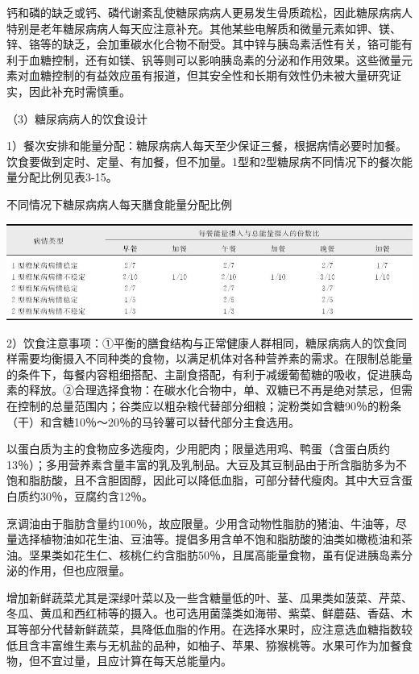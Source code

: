 钙和磷的缺乏或钙、磷代谢紊乱使糖尿病病人更易发生骨质疏松，因此糖尿病病人特别是老年糖尿病病人每天应注意补充。其他某些电解质和微量元素如钾、镁、锌、铬等的缺乏，会加重碳水化合物不耐受。其中锌与胰岛素活性有关，铬可能有利于血糖控制，还有如镁、钒等则可以影响胰岛素的分泌和作用效果。这些微量元素对血糖控制的有益效应虽有报道，但其安全性和长期有效性仍未被大量研究证实，因此补充时需慎重。

（3）糖尿病病人的饮食设计

1）餐次安排和能量分配：糖尿病病人每天至少保证三餐，根据病情必要时加餐。饮食要做到定时、定量、有加餐，但不加量。1型和2型糖尿病不同情况下的餐次能量分配比例见表3-15。

\begin{table}[htbp]
\centering
\caption{不同情况下糖尿病病人每天膳食能量分配比例}
\label{tab3-15}
\includegraphics{./images/Image00031.jpg}
\end{table}

2）饮食注意事项：①平衡的膳食结构与正常健康人群相同，糖尿病病人的饮食同样需要均衡摄入不同种类的食物，以满足机体对各种营养素的需求。在限制总能量的条件下，每餐内容粗细搭配、主副食搭配，有利于减缓葡萄糖的吸收，促进胰岛素的释放。②合理选择食物：在碳水化合物中，单、双糖已不再是绝对禁忌，但需在控制的总量范围内；谷类应以粗杂粮代替部分细粮；淀粉类如含糖90％的粉条（干）和含糖10％～20％的马铃薯可以替代部分主食选用。

以蛋白质为主的食物应多选瘦肉，少用肥肉；限量选用鸡、鸭蛋（含蛋白质约13％）；多用营养素含量丰富的乳及乳制品。大豆及其豆制品由于所含脂肪多为不饱和脂肪酸，且不含胆固醇，因此可以降低血脂，可部分替代瘦肉。其中大豆含蛋白质约30％，豆腐约含12％。

烹调油由于脂肪含量约100％，故应限量。少用含动物性脂肪的猪油、牛油等，尽量选择植物油如花生油、豆油等。提倡多用含单不饱和脂肪酸的油类如橄榄油和茶油。坚果类如花生仁、核桃仁约含脂肪50％，且属高能量食物，虽有促进胰岛素分泌的作用，但也应限量。

增加新鲜蔬菜尤其是深绿叶菜以及一些含糖量低的叶、茎、瓜果类如菠菜、芹菜、冬瓜、黄瓜和西红柿等的摄入。也可选用菌藻类如海带、紫菜、鲜蘑菇、香菇、木耳等部分代替新鲜蔬菜，具降低血脂的作用。在选择水果时，应注意选血糖指数较低且含丰富维生素与无机盐的品种，如柚子、苹果、猕猴桃等。水果可作为加餐食物，但不宜过量，且应计算在每天总能量内。

